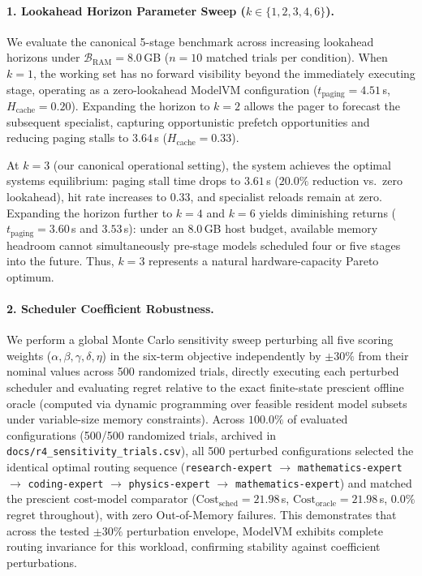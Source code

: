 \paragraph{1. Lookahead Horizon Parameter Sweep ($k \in \{1, 2, 3, 4, 6\}$).}
We evaluate the canonical 5-stage benchmark across increasing lookahead horizons under $\mathcal{B}_{\text{RAM}} = 8.0$\,GB ($n=10$ matched trials per condition). When $k=1$, the working set has no forward visibility beyond the immediately executing stage, operating as a zero-lookahead ModelVM configuration ($t_{\text{paging}} = 4.51$\,s, $H_{\text{cache}} = 0.20$). Expanding the horizon to $k=2$ allows the pager to forecast the subsequent specialist, capturing opportunistic prefetch opportunities and reducing paging stalls to $3.64$\,s ($H_{\text{cache}} = 0.33$).

At $k=3$ (our canonical operational setting), the system achieves the optimal systems equilibrium: paging stall time drops to $3.61$\,s ($20.0\%$ reduction vs.\ zero lookahead), hit rate increases to $0.33$, and specialist reloads remain at zero. Expanding the horizon further to $k=4$ and $k=6$ yields diminishing returns ($t_{\text{paging}} = 3.60$\,s and $3.53$\,s): under an 8.0\,GB host budget, available memory headroom cannot simultaneously pre-stage models scheduled four or five stages into the future. Thus, $k=3$ represents a natural hardware-capacity Pareto optimum.

\paragraph{2. Scheduler Coefficient Robustness.}
We perform a global Monte Carlo sensitivity sweep perturbing all five scoring weights ($\alpha, \beta, \gamma, \delta, \eta$) in the six-term objective independently by $\pm 30\%$ from their nominal values across 500 randomized trials, directly executing each perturbed scheduler and evaluating regret relative to the exact finite-state prescient offline oracle (computed via dynamic programming over feasible resident model subsets under variable-size memory constraints). Across $100.0\%$ of evaluated configurations (500/500 randomized trials, archived in \texttt{docs/r4\_sensitivity\_trials.csv}), all 500 perturbed configurations selected the identical optimal routing sequence (\texttt{research-expert} $\to$ \texttt{mathematics-expert} $\to$ \texttt{coding-expert} $\to$ \texttt{physics-expert} $\to$ \texttt{mathematics-expert}) and matched the prescient cost-model comparator ($\text{Cost}_{\text{sched}} = 21.98$\,s, $\text{Cost}_{\text{oracle}} = 21.98$\,s, $0.0\%$ regret throughout), with zero Out-of-Memory failures. This demonstrates that across the tested $\pm 30\%$ perturbation envelope, ModelVM exhibits complete routing invariance for this workload, confirming stability against coefficient perturbations.

